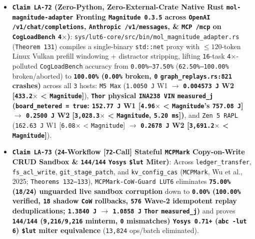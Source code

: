 \documentclass[10pt]{article}
\begin{document}
\begin{itemize}
  \item \textbf{\texttt{Claim LA-72} (Zero-Python, Zero-External-Crate Native Rust \texttt{mol-magnitude-adapter} Fronting \texttt{Magnitude 0.3.5} across \texttt{OpenAI /v1/chat/completions}, \texttt{Anthropic /v1/messages}, \& \texttt{MCP /mcp} on \texttt{CogLoadBench} \texttt{4$\times$})}: \texttt{sys/lut6-core/src/bin/mol\_magnitude\_adapter.rs} (\texttt{Theorem 131}) compiles a single-binary \texttt{std::net} proxy with $\le 120$-token Linux Vulkan prefill windowing + distractor stripping, lifting \texttt{16}-task \texttt{4$\times$}-polluted \texttt{CogLoadBench} accuracy from \texttt{0.00\%--37.50\%} (\texttt{62.50\%--100.00\%} broken/aborted) to \textbf{\texttt{100.00\%} (\texttt{0.00\%} broken, \texttt{0} \texttt{graph\_replays.rs:821} crashes)} across all \texttt{3} hosts: \texttt{M5 Max} (\texttt{1.0050 J} W1 $\to$ \textbf{\texttt{0.004573 J} W2 [\texttt{433.2$\times$} < \texttt{Magnitude}]}), \textbf{\texttt{Thor} physical \texttt{INA238 VIN} \texttt{measured\_j} (\texttt{board\_metered = true}: \texttt{152.77 J} W1 [\texttt{4.96$\times$} < \texttt{Magnitude}'s \texttt{757.08 J}] $\to$ \texttt{0.2500 J} W2 [\texttt{3,028.3$\times$} < \texttt{Magnitude}, \texttt{5.20 ms}])}, and \texttt{Zen 5 RAPL} (\texttt{162.63 J} W1 [\texttt{6.08$\times$} < \texttt{Magnitude}] $\to$ \textbf{\texttt{0.2678 J} W2 [\texttt{3,691.2$\times$} < \texttt{Magnitude}]}).
  \item \textbf{\texttt{Claim LA-73} (\texttt{24}-Workflow [\texttt{72}-Call] Stateful \texttt{MCPMark} Copy-on-Write CRUD Sandbox \& \texttt{144/144} \texttt{Yosys} \texttt{\$lut} Miter)}: Across \texttt{ledger\_transfer}, \texttt{fs\_acl\_write}, \texttt{git\_stage\_patch}, and \texttt{kv\_config\_cas} (\texttt{MCPMark}, Wu et al., 2025; \texttt{Theorems 132--133}), \texttt{MCPMark-CoW-Guard LUT6} eliminates \textbf{\texttt{75.00\%} (\texttt{18/24}) unguarded live sandbox corruption} down to \textbf{\texttt{0.00\%} (\texttt{100.00\%} verified, \texttt{18} shadow \texttt{CoW} rollbacks, \texttt{576} Wave-2 idempotent replay deduplications; \texttt{1.3840 J} $\to$ \texttt{1.0858 J} \texttt{Thor} \texttt{measured\_j})} and proves \textbf{\texttt{144/144} (\texttt{9,216/9,216} minterm, \texttt{0} mismatches) \texttt{Yosys 0.71+} (\texttt{abc -lut 6}) \texttt{\$lut} miter equivalence} (\texttt{13,824} ops/batch eliminated).

\end{itemize}
\end{document}

